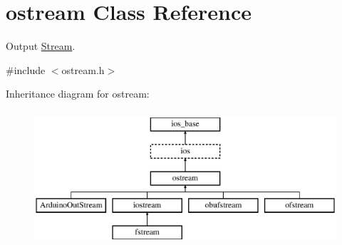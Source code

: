 \hypertarget{classostream}{\section{ostream Class Reference}
\label{classostream}
}


Output \hyperlink{class_stream}{Stream}.  




{\ttfamily \#include $<$ostream.\-h$>$}

Inheritance diagram for ostream\-:\begin{figure}[H]
\begin{center}
\leavevmode
\includegraphics[height=5.000000cm]{classostream}
\end{center}
\end{figure}
